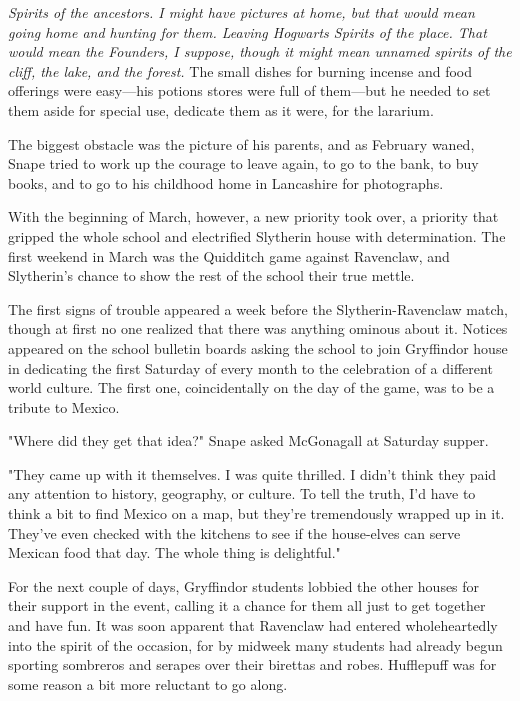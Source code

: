 \emph{Spirits of the ancestors. I might have pictures at home, but that would mean going home and hunting for them. Leaving Hogwarts{\el} Spirits of the place. That would mean the Founders, I suppose, though it might mean unnamed spirits of the cliff, the lake, and the forest.} The small dishes for burning incense and food offerings were easy—his potions stores were full of them—but he needed to set them aside for special use, dedicate them as it were, for the lararium.

The biggest obstacle was the picture of his parents, and as February waned, Snape tried to work up the courage to leave again, to go to the bank, to buy books, and to go to his childhood home in Lancashire for photographs.

With the beginning of March, however, a new priority took over, a priority that gripped the whole school and electrified Slytherin house with determination. The first weekend in March was the Quidditch game against Ravenclaw, and Slytherin's chance to show the rest of the school their true mettle.

The first signs of trouble appeared a week before the Slytherin-Ravenclaw match, though at first no one realized that there was anything ominous about it. Notices appeared on the school bulletin boards asking the school to join Gryffindor house in dedicating the first Saturday of every month to the celebration of a different world culture. The first one, coincidentally on the day of the game, was to be a tribute to Mexico.

"Where did they get that idea?" Snape asked McGonagall at Saturday supper.

"They came up with it themselves. I was quite thrilled. I didn't think they paid any attention to history, geography, or culture. To tell the truth, I'd have to think a bit to find Mexico on a map, but they're tremendously wrapped up in it. They've even checked with the kitchens to see if the house-elves can serve Mexican food that day. The whole thing is delightful."

For the next couple of days, Gryffindor students lobbied the other houses for their support in the event, calling it a chance for them all just to get together and have fun. It was soon apparent that Ravenclaw had entered wholeheartedly into the spirit of the occasion, for by midweek many students had already begun sporting sombreros and serapes over their birettas and robes. Hufflepuff was for some reason a bit more reluctant to go along.

